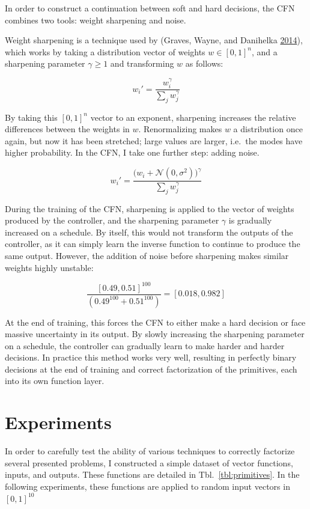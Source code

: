 \documentclass[12pt,twoside]{mitthesis}
\begin{document}
In order to construct a continuation between soft and hard decisions,
the CFN combines two tools: weight sharpening and noise.

Weight sharpening is a technique used by (Graves, Wayne, and Danihelka
\protect\hyperlink{ref-graves2014neural}{2014}), which works by taking a
distribution vector of weights \(w \in [0,1]^n\), and a sharpening
parameter \(\gamma \ge 1\) and transforming \(w\) as follows:

\[w_i' = \frac{w_i^{\gamma}}{\sum_j w_j^{\gamma}}\]

By taking this \([0,1]^n\) vector to an exponent, sharpening increases
the relative differences between the weights in \(w\). Renormalizing
makes \(w\) a distribution once again, but now it has been stretched;
large values are larger, i.e.~the modes have higher probability. In the
CFN, I take one further step: adding noise.

\[w_i' = \frac{\big(w_i + \mathcal{N}(0, \sigma^2)\big)^{\gamma}}{\sum_j w_j^{\gamma}}\]

During the training of the CFN, sharpening is applied to the vector of
weights produced by the controller, and the sharpening parameter
\(\gamma\) is gradually increased on a schedule. By itself, this would
not transform the outputs of the controller, as it can simply learn the
inverse function to continue to produce the same output. However, the
addition of noise before sharpening makes similar weights highly
unstable:

\[\frac{[0.49, 0.51]^{100}}{(0.49^{100} + 0.51^{100})} = [0.018, 0.982]\]

At the end of training, this forces the CFN to either make a hard
decision or face massive uncertainty in its output. By slowly increasing
the sharpening parameter on a schedule, the controller can gradually
learn to make harder and harder decisions. In practice this method works
very well, resulting in perfectly binary decisions at the end of
training and correct factorization of the primitives, each into its own
function layer.

\section{Experiments}\label{experiments-1}

In order to carefully test the ability of various techniques to
correctly factorize several presented problems, I constructed a simple
dataset of vector functions, inputs, and outputs. These functions are
detailed in Tbl.~\ref{tbl:primitives}. In the following experiments,
these functions are applied to random input vectors in \([0,1]^10\)
\end{document}

